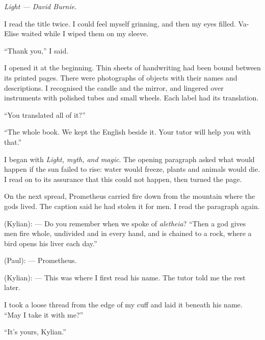 \textit{Light --- David Burnie.}\par

I read the title twice. I could feel myself grinning, and then my eyes filled. Va-Elise waited while I wiped them on my sleeve.\par

``Thank you,'' I said.\par

I opened it at the beginning. Thin sheets of handwriting had been bound between its printed pages. There were photographs of objects with their names and descriptions. I recognised the candle and the mirror, and lingered over instruments with polished tubes and small wheels. Each label had its translation.\par

``You translated all of it?''\par

``The whole book. We kept the English beside it. Your tutor will help you with that.''\par

I began with \textit{Light, myth, and magic}. The opening paragraph asked what would happen if the sun failed to rise: water would freeze, plants and animals would die. I read on to its assurance that this could not happen, then turned the page.\par

On the next spread, Prometheus carried fire down from the mountain where the gods lived. The caption said he had stolen it for men. I read the paragraph again.\par

\begin{room}

(Kylian): --- Do you remember when we spoke of \textit{aletheia}? ``Then a god gives men fire whole, undivided and in every hand, and is chained to a rock, where a bird opens his liver each day.''

(Paul): --- Prometheus.

(Kylian): --- This was where I first read his name. The tutor told me the rest later.

\end{room}

I took a loose thread from the edge of my cuff and laid it beneath his name. ``May I take it with me?''\par

``It's yours, Kylian.''\par

